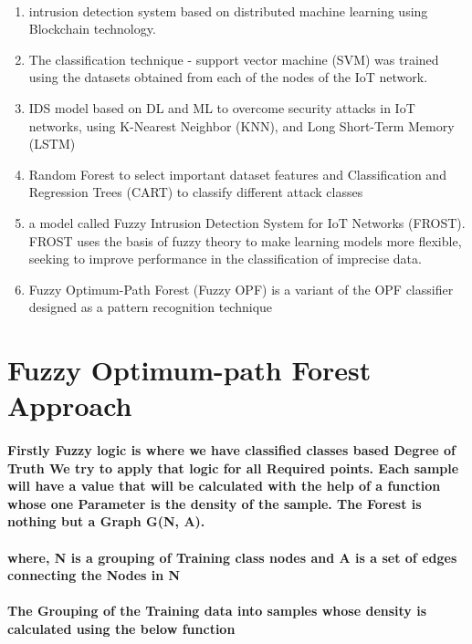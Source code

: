 \documentclass[a4paper,15pt]{article}
\begin{document}
\paragraph{}
\begin{enumerate}
    \item intrusion detection system based on
distributed machine learning using Blockchain technology.
    \item
    The classification technique - support vector machine (SVM) was trained using the datasets obtained from each of the nodes of the IoT network.
    \item IDS model based on DL and ML to overcome security
attacks in IoT networks, using K-Nearest Neighbor (KNN), and
Long Short-Term Memory (LSTM)
    \item Random Forest to select
important dataset features and Classification and Regression
Trees (CART) to classify different attack classes
    \item a model called Fuzzy Intrusion Detection
System for IoT Networks (FROST). FROST uses the basis of
fuzzy theory to make learning models more flexible, seeking
to improve performance in the classification of imprecise data.
    \item Fuzzy Optimum-Path Forest (Fuzzy OPF)  is a variant
of the OPF classifier designed as a pattern recognition
technique
\end{enumerate}
\section*{Fuzzy Optimum-path Forest Approach}
\paragraph{
 Firstly Fuzzy logic is where we have classified classes based Degree of Truth
 We try to apply that logic for all Required points. Each sample will have a value that will be calculated with the help of a function whose one Parameter is the density of the sample. The Forest is nothing but a Graph G(N, A).
}
\paragraph{\textbf{
where,
N is a grouping of Training class nodes and  A is a set of edges connecting the Nodes in N
}}
\paragraph{
The Grouping of the Training data into samples whose density is calculated using the below function
}
\end{document}
